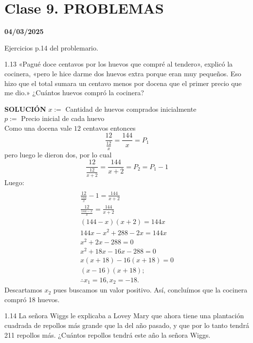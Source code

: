 \chapter{Clase 9. PROBLEMAS}
\textbf{04/03/2025}

Ejercicios p.14 del problemario.
\begin{excercise}
    1.13 «Pagué doce centavos por los huevos que compré al tendero», explicó la cocinera, «pero le hice darme dos huevos extra porque eran muy pequeños. Eso hizo que el total sumara un centavo menos por docena que el primer precio que me dio.» ¿Cuántos huevos compró la cocinera?
\end{excercise}

\textbf{SOLUCIÓN}
    $x :=$ Cantidad de huevos comprados inicialmente\\
    $p :=$ Precio inicial de cada huevo\\
    Como una docena vale $12$ centavos entonces
    \[ \frac{12}{\frac{12}{x}} = \frac{144}{x} = P_1 \]
    pero luego le dieron dos, por lo cual
    \[ \frac{12}{\frac{12}{x+2}} = \frac{144}{x+2} = P_2 = P_1 -1 \]
    Luego:\\
    \begin{gather*}
        \\ \frac{12}{\frac{144}{x}}-1 = \frac{144}{x+2}
        \\ \frac{12}{\frac{144-x}{x}} = \frac{144}{x+2}
        \\ (144-x)(x+2) = 144x
        \\ 144x -x^{2} + 288 -2x = 144x
        \\ x^{2}+2x-288 = 0
        \\ x^{2} + 18x -16x - 288 = 0
        \\ x(x+18) -16(x+18) = 0
        \\ (x-16)(x+18); 
        \\ \therefore x_1 = 16, x_2 = -18.
    \end{gather*}
    Descartamos $x_2$ pues buscamos un valor positivo. Así, concluímos que la cocinera compró 18 huevos.

\begin{excercise}
    1.14 La señora Wiggs le explicaba a Lovey Mary que ahora tiene una plantación cuadrada de repollos más grande que la del año pasado, y que por lo tanto tendrá 211 repollos más. ¿Cuántos repollos tendrá este año la señora Wiggs.
\end{excercise}

